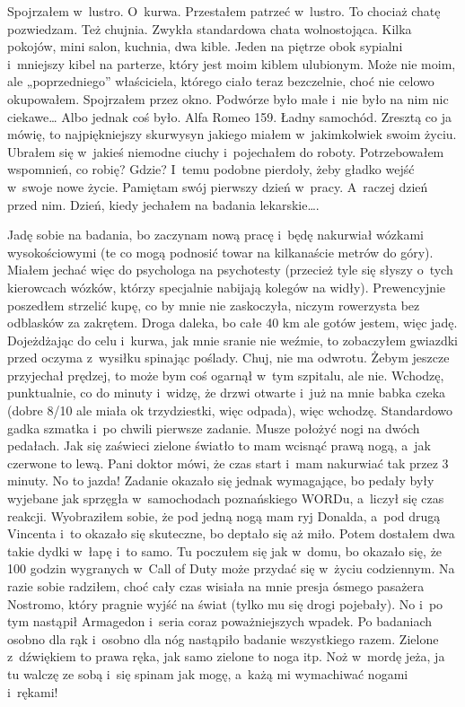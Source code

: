 Spojrzałem w~lustro. O~kurwa. Przestałem patrzeć w~lustro. To chociaż chatę pozwiedzam. Też chujnia. Zwykła standardowa chata wolnostojąca. Kilka pokojów, mini salon, kuchnia, dwa kible. Jeden na piętrze obok sypialni i~mniejszy kibel na parterze, który jest moim kiblem ulubionym. Może nie moim, ale „poprzedniego” właściciela, którego ciało teraz bezczelnie, choć nie celowo okupowałem. Spojrzałem przez okno. Podwórze było małe i~nie było na nim nic ciekawe… Albo jednak coś było. Alfa Romeo 159. Ładny samochód. Zresztą co ja mówię, to najpiękniejszy skurwysyn jakiego miałem w~jakimkolwiek swoim życiu. Ubrałem się w~jakieś niemodne ciuchy i~pojechałem do roboty. Potrzebowałem wspomnień, co robię? Gdzie? I~temu podobne pierdoły, żeby gładko wejść w~swoje nowe życie. Pamiętam swój pierwszy dzień w~pracy. A~raczej dzień przed nim. Dzień, kiedy jechałem na badania lekarskie….

Jadę sobie na badania, bo zaczynam nową pracę i~będę nakurwiał wózkami wysokościowymi (te co mogą podnosić towar na kilkanaście metrów do góry). Miałem jechać więc do psychologa na psychotesty (przecież tyle się słyszy o~tych kierowcach wózków, którzy specjalnie nabijają kolegów na widły). Prewencyjnie poszedłem strzelić kupę, co by mnie nie zaskoczyła, niczym rowerzysta bez odblasków za zakrętem. Droga daleka, bo całe 40 km ale gotów jestem, więc jadę. Dojeżdżając do celu i~kurwa, jak mnie sranie nie weźmie, to zobaczyłem gwiazdki przed oczyma z~wysiłku spinając poślady. Chuj, nie ma odwrotu. Żebym jeszcze przyjechał prędzej, to może bym coś ogarnął w~tym szpitalu, ale nie. Wchodzę, punktualnie, co do minuty i~widzę, że drzwi otwarte i~już na mnie babka czeka (dobre 8/10 ale miała ok trzydziestki, więc odpada), więc wchodzę. Standardowo gadka szmatka i~po chwili pierwsze zadanie. Musze położyć nogi na dwóch pedałach. Jak się zaświeci zielone światło to mam wcisnąć prawą nogą, a~jak czerwone to lewą. Pani doktor mówi, że czas start i~mam nakurwiać tak przez 3 minuty. No to jazda! Zadanie okazało się jednak wymagające, bo pedały były wyjebane jak sprzęgła w~samochodach poznańskiego WORDu, a~liczył się czas reakcji. Wyobraziłem sobie, że pod jedną nogą mam ryj Donalda, a~pod drugą Vincenta i~to okazało się skuteczne, bo deptało się aż miło. Potem dostałem dwa takie dydki w~łapę i~to samo. Tu poczułem się jak w~domu, bo okazało się, że 100 godzin wygranych w~Call of Duty może przydać się w~życiu codziennym. Na razie sobie radziłem, choć cały czas wisiała na mnie presja ósmego pasażera Nostromo, który pragnie wyjść na świat (tylko mu się drogi pojebały). No i~po tym nastąpił Armagedon i~seria coraz poważniejszych wpadek. Po badaniach osobno dla rąk i~osobno dla nóg nastąpiło badanie wszystkiego razem. Zielone z~dźwiękiem to prawa ręka, jak samo zielone to noga itp. Noż w~mordę jeża, ja tu walczę ze sobą i~się spinam jak mogę, a~każą mi wymachiwać nogami i~rękami! 

